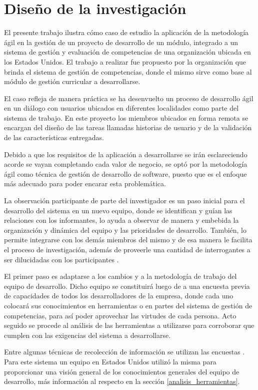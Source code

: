 \section{Diseño de la investigación}
El presente trabajo ilustra cómo caso de estudio la aplicación de la metodología ágil en la gestión de un proyecto de desarrollo de un módulo, integrado a un sistema de gestión y evaluación de competencias de una organización ubicada en los Estados Unidos. El trabajo a realizar fue propuesto por la organización que brinda el sistema de gestión de competencias, donde el mismo sirve como base al módulo de gestión curricular a desarrollarse.

El caso refleja de manera práctica se ha desenvuelto un proceso de desarrollo ágil en un diálogo con usuarios ubicados en diferentes localidades como parte del sistema de trabajo. En este proyecto los miembros ubicados en forma remota se encargan del diseño de las tareas llamadas historias de usuario y de la validación de las características entregadas.

Debido a que los requisitos de la aplicación a desarrollarse se irán esclareciendo acorde se vayan completando cada valor de negocio, se optó por la metodología ágil como técnica de gestión de desarrollo de software, puesto que es el enfoque más adecuado para poder encarar esta problemática.

La observación participante de parte del investigador es un paso inicial para el desarrollo del sistema en un nuevo equipo, donde se identifican y guían las relaciones con los informantes, lo ayuda a observar de manera y embebida la organización y dinámica del equipo y las prioridades de desarrollo. También, lo permite integrarse con los demás miembros del mismo y de esa manera le facilita el proceso de investigación, además de proveerle una cantidad de interrogantes a ser dilucidadas con los participantes \citep{erlandson_doing_1993}.

El primer paso es adaptarse a los cambios y a la metodología de trabajo del equipo de desarrollo. Dicho equipo se constituirá luego de a una encuesta previa de capacidades de todos los desarrolladores de la empresa, donde cada uno colocará sus conocimientos en herramientas o en partes del sistema de gestión de competencias, para así poder aprovechar las virtudes de cada persona. Acto seguido se procede al análisis de las herramientas a utilizarse para corroborar que cumplen con las exigencias del sistema a desarrollarse.

Entre algunas técnicas de recolección de información se utilizan las encuestas \citep{robson_real_2011}. Para este sistema un equipo en Estados Unidos utilizó la misma para proporcionar una visión general de los conocimientos generales del equipo de desarrollo, más información al respecto en la sección \ref{analisis_herramientas}.

